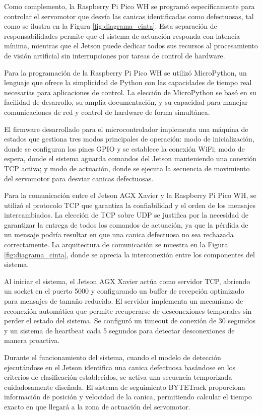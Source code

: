 \documentclass[11pt,spanish,listoffigures,listoftables]{tfgetsinf}
\begin{document}
Como complemento, la Raspberry Pi Pico WH se programó específicamente para controlar el servomotor que desvía las canicas identificadas como defectuosas, tal como se ilustra en la Figura \ref{fig:diagrama_cinta}. Esta separación de responsabilidades permite que el sistema de actuación responda con latencia mínima, mientras que el Jetson puede dedicar todos sus recursos al procesamiento de visión artificial sin interrupciones por tareas de control de hardware.

Para la programación de la Raspberry Pi Pico WH se utilizó MicroPython\cite{micropython_home}, un lenguaje que ofrece la simplicidad de Python con las capacidades de tiempo real necesarias para aplicaciones de control. La elección de MicroPython se basó en su facilidad de desarrollo, su amplia documentación, y su capacidad para manejar comunicaciones de red y control de hardware de forma simultánea.

El firmware desarrollado para el microcontrolador implementa una máquina de estados que gestiona tres modos principales de operación: modo de inicialización, donde se configuran los pines GPIO y se establece la conexión WiFi; modo de espera, donde el sistema aguarda comandos del Jetson manteniendo una conexión TCP activa; y modo de actuación, donde se ejecuta la secuencia de movimiento del servomotor para desviar canicas defectuosas.

Para la comunicación entre el Jetson AGX Xavier y la Raspberry Pi Pico WH, se utilizó el protocolo TCP que garantiza la confiabilidad y el orden de los mensajes intercambiados. La elección de TCP sobre UDP se justifica por la necesidad de garantizar la entrega de todos los comandos de actuación, ya que la pérdida de un mensaje podría resultar en que una canica defectuosa no sea rechazada correctamente. La arquitectura de comunicación se muestra en la Figura \ref{fig:diagrama_cinta}, donde se aprecia la interconexión entre los componentes del sistema.

Al iniciar el sistema, el Jetson AGX Xavier actúa como servidor TCP, abriendo un socket en el puerto 5000 y configurando un buffer de recepción optimizado para mensajes de tamaño reducido. El servidor implementa un mecanismo de reconexión automática que permite recuperarse de desconexiones temporales sin perder el estado del sistema. Se configuró un timeout de conexión de 30 segundos y un sistema de heartbeat cada 5 segundos para detectar desconexiones de manera proactiva.

Durante el funcionamiento del sistema, cuando el modelo de detección ejecutándose en el Jetson identifica una canica defectuosa basándose en los criterios de clasificación establecidos, se activa una secuencia temporizada cuidadosamente diseñada. El sistema de seguimiento BYTETrack proporciona información de posición y velocidad de la canica, permitiendo calcular el tiempo exacto en que llegará a la zona de actuación del servomotor.
\end{document}
